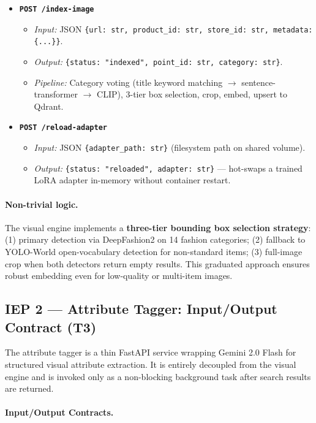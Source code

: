 \documentclass[12pt]{article}
\begin{document}
\begin{itemize}[leftmargin=*]
    \item \textbf{\texttt{POST /index-image}}
      \begin{itemize}
          \item \emph{Input:} JSON \texttt{\{url: str, product\_id: str, store\_id: str, metadata: \{...\}\}}.
          \item \emph{Output:} \texttt{\{status: "indexed", point\_id: str, category: str\}}.
          \item \emph{Pipeline:} Category voting (title keyword matching $\to$ sentence-transformer $\to$ CLIP), 3-tier box selection, crop, embed, upsert to Qdrant.
      \end{itemize}

    \item \textbf{\texttt{POST /reload-adapter}}
      \begin{itemize}
          \item \emph{Input:} JSON \texttt{\{adapter\_path: str\}} (filesystem path on shared volume).
          \item \emph{Output:} \texttt{\{status: "reloaded", adapter: str\}} --- hot-swaps a trained LoRA adapter in-memory without container restart.
      \end{itemize}
\end{itemize}

\paragraph{Non-trivial logic.} The visual engine implements a \textbf{three-tier bounding box selection strategy}: (1) primary detection via DeepFashion2 on 14 fashion categories; (2) fallback to YOLO-World open-vocabulary detection for non-standard items; (3) full-image crop when both detectors return empty results. This graduated approach ensures robust embedding even for low-quality or multi-item images.

\subsection{IEP 2 --- Attribute Tagger: Input/Output Contract (T3)}

The attribute tagger is a thin FastAPI service wrapping Gemini 2.0 Flash for structured visual attribute extraction. It is entirely decoupled from the visual engine and is invoked only as a non-blocking background task after search results are returned.

\paragraph{Input/Output Contracts.}
\end{document}
